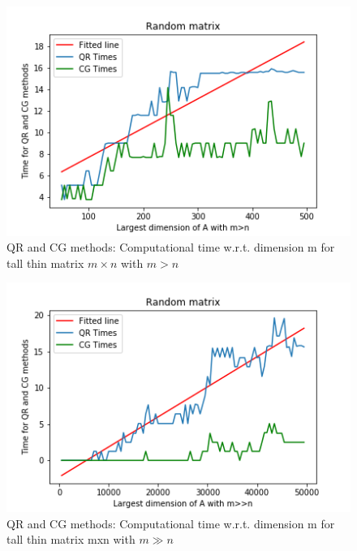 \documentclass{article}
\begin{document}
        \begin{figure}
            \includegraphics[width=\linewidth]{../results/little_m.png}
            \caption{QR and CG methods: Computational time w.r.t. dimension m for tall thin matrix $m \times n$ with $m > n$}
        \end{figure}
        \begin{figure}
            \includegraphics[width=\linewidth]{../results/big_m.png}
            \caption{QR and CG methods: Computational time w.r.t. dimension m for tall thin matrix mxn with $m \gg n$}
        \end{figure}



\end{document}
